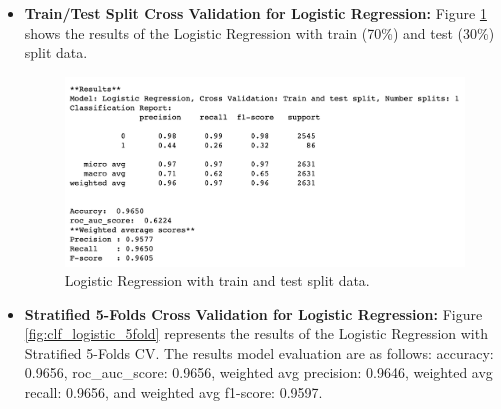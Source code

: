 \documentclass[11pt]{article}
\begin{document}
\begin{itemize}
\item \textbf{Train/Test Split Cross Validation for Logistic Regression:}
Figure \ref{fig:clf_logistic_split_result} shows the results of the Logistic Regression with train (70\%) and test (30\%) split data.
%
\begin{figure}[h]
\centering 
\includegraphics[scale=0.5]{clf_logistic_split_result.png}
\caption{Logistic Regression with train and test split data.}
  \label{fig:clf_logistic_split_result}
\end{figure}

\item \textbf{Stratified 5-Folds Cross Validation for Logistic Regression:}
Figure \ref{fig:clf_logistic_5fold} represents the results of the Logistic Regression with Stratified 5-Folds CV.
%
The results model evaluation are as follows:
accuracy: 0.9656,
roc\_auc\_score: 0.9656,
weighted avg precision: 0.9646,
weighted avg recall: 0.9656, and
weighted avg f1-score: 0.9597.


\end{itemize}
\end{document}
